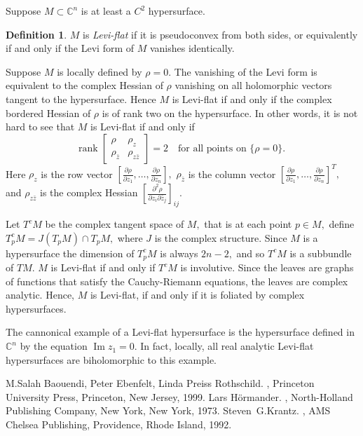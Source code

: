 \documentclass[12pt]{article}
\theoremstyle{theorem}
\theoremstyle{definition}
\newtheorem*{defn}{Definition}
\theoremstyle{remark}
\begin{document}
Suppose $M \subset {\mathbb{C}}^n$ is at least a $C^2$ hypersurface.

\begin{defn}
$M$ is \emph{Levi-flat} if it is pseudoconvex from both sides, or equivalently if and only if the Levi form of $M$ vanishes identically.
\end{defn}

Suppose $M$ is locally defined by $\rho = 0$.
The vanishing of the Levi form is equivalent to the complex
Hessian of $\rho$ vanishing on all holomorphic vectors tangent to the hypersurface.
Hence $M$ 
is Levi-flat if and only if the complex bordered Hessian of $\rho$
is of rank two on the hypersurface.  In other words, it is not hard to see that
$M$ is Levi-flat if and only if
\begin{equation*}
\operatorname{rank}
\left[
\begin{matrix}
\rho & \rho_z \\
\rho_{\bar{z}} & \rho_{z\bar{z}}
\end{matrix}
\right]
= 2
\ \ \ \text{ for all points on $\{\rho = 0\}$. }
\end{equation*}
Here $\rho_z$ is the row vector
$\left[ \frac{\partial \rho}{\partial z_1} ,\ldots,
\frac{\partial \rho}{\partial z_n} \right] ,$ 
$\rho_{\bar{z}}$ is the column vector
$\left[ \frac{\partial \rho}{\partial z_1} ,\ldots,
\frac{\partial \rho}{\partial z_n} \right]^T ,$
and $\rho_{z\bar{z}}$ is the complex Hessian
$\left[
\frac{\partial^2 \rho}{\partial z_i \partial \bar{z}_j}
\right]_{ij}.$

Let $T^cM$ be the complex tangent space of $M,$ that is at each point $p \in M,$
define 
$T_p^cM = J(T_pM) \cap T_pM,$
where $J$ is the complex structure.
Since $M$ is a hypersurface the dimension
of $T_p^cM$ is always $2n-2,$ and so $T^cM$ is a subbundle of $TM.$  $M$ is Levi-flat
if and only if $T^cM$ is involutive.  Since the leaves are graphs of functions that satisfy
the Cauchy-Riemann equations, the leaves are complex analytic.  Hence, $M$ is Levi-flat, if and only if it is foliated by complex hypersurfaces.

The cannonical example of a Levi-flat hypersurface is the hypersurface defined in ${\mathbb{C}}^n$ by
the equation $\operatorname{Im} z_1 = 0$.  In fact, locally, all real analytic Levi-flat hypersurfaces
are biholomorphic to this example.

\begin{thebibliography}{9}
M.\@ Salah Baouendi,
Peter Ebenfelt,
Linda Preiss Rothschild.
{\em {}},
Princeton University Press,
Princeton, New Jersey, 1999.
Lars H\"ormander.
{\em {}},
North-Holland Publishing Company, New York, New York, 1973.
Steven~G.\@ Krantz.
{\em {}},
AMS Chelsea Publishing, Providence, Rhode Island, 1992.
\end{thebibliography}
\end{document}
